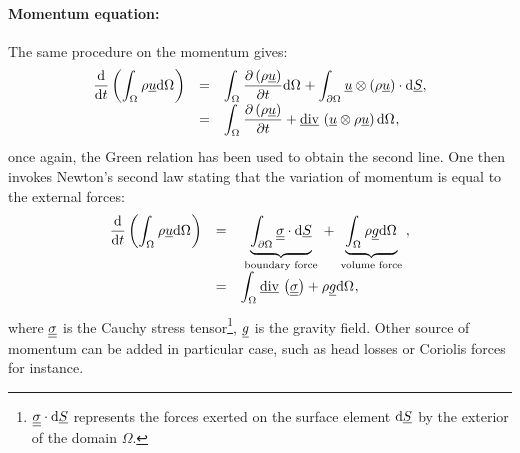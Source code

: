 \paragraph{Momentum equation:}
The same procedure on the momentum gives:
\begin{equation}\label{eq:goveqn:leibnitz_th_momentum}
\begin{array}{r c l}
\displaystyle \dfrac{\mathrm{d} }{\mathrm{d} t} \left( \int_{\Omega_{} }\rho \underline{u} \mathrm{d} \Omega_{}\right) &=&
\displaystyle \int_{\Omega_{} }\dfrac{\partial \left( \rho \underline{u} \right) }{\partial t} \mathrm{d} \Omega_{} + \int_{\partial \Omega_{}}  \underline{u}\otimes \left( \rho \underline{u} \right) \cdot  \mathrm{d} \underline{S}, \\
\displaystyle &=&
\displaystyle \int_{\Omega_{ }} \dfrac{\partial \left( \rho \underline{u} \right) }{\partial t} + \underline{\text{div}}\, \left( \underline{u} \otimes \rho \underline{u} \right)  \mathrm{d} \Omega_{},
\end{array}
 \end{equation}
once again, the Green relation has been used to obtain the second line. One then invokes Newton's second law
stating that the variation of momentum is equal to the external forces:
\begin{equation}\label{eq:goveqn:leibnitz_th_momentum2}
\begin{array}{r c l}
\displaystyle \dfrac{\mathrm{d} }{\mathrm{d} t} \left( \int_{\Omega_{}} \rho \underline{u} \mathrm{d} \Omega_{}\right) &=&
\displaystyle
\underbrace{
\int_{\partial \Omega_{}}  \underline{\underline{\sigma}} \cdot  \mathrm{d} \underline{S}
}_{
\text{ boundary force }
}
+
\underbrace{
\int_{\Omega_{} }\rho \underline{g} \mathrm{d} \Omega_{}
}_{
\text{ volume force }
}
, \\
\displaystyle &=&
\displaystyle \int_{\Omega_{ }} \underline{\text{div}}\, \left( \underline{\underline{\sigma}} \right) + \rho \underline{g}  \mathrm{d} \Omega_{},
\end{array}
 \end{equation}
where $\underline{\underline{\sigma}}$ is the Cauchy stress tensor\footnote{
$\underline{\underline{\sigma}} \cdot \mathrm{d} \underline{S}$ represents the forces exerted on the surface element
$ \mathrm{d} \underline{S} $ by the exterior of the domain $\Omega$.
}, $\underline{g}$ is the gravity field. Other source of momentum can be added in particular case, such
as head losses or Coriolis forces for instance.


